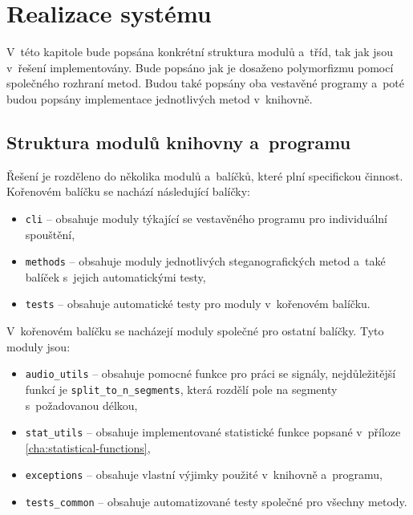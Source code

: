 
\chapter{Realizace systému}
\label{cha:implementation}

V~této kapitole bude popsána konkrétní struktura modulů a~tříd, tak jak jsou
v~řešení implementovány. Bude popsáno jak je dosaženo polymorfizmu pomocí
společného rozhraní metod. Budou také popsány oba vestavěné programy a~poté
budou popsány implementace jednotlivých metod v~knihovně.

\section{Struktura modulů knihovny a~programu}
\label{sec:modules}

Řešení je rozděleno do několika modulů a~balíčků, které plní specifickou
činnost. Kořenovém balíčku se nachází následující balíčky:

\begin{itemize}
    \item \texttt{cli} -- obsahuje moduly týkající se vestavěného programu pro
        individuální spouštění,
    \item \texttt{methods} -- obsahuje moduly jednotlivých steganografických
        metod a~také balíček s~jejich automatickými testy,
    \item \texttt{tests} -- obsahuje automatické testy pro moduly v~kořenovém
        balíčku.
\end{itemize}

V~kořenovém balíčku se nacházejí moduly společné pro ostatní balíčky. Tyto
moduly jsou:

\begin{itemize}
    \item \texttt{audio\_utils} -- obsahuje pomocné funkce pro práci se signály,
        nejdůležitější funkcí je \texttt{split\_to\_n\_segments}, která rozdělí
        pole na segmenty s~požadovanou délkou,
    \item \texttt{stat\_utils} -- obsahuje implementované statistické funkce
        popsané v~příloze \ref{cha:statistical-functions},
    \item \texttt{exceptions} -- obsahuje vlastní výjimky použité v~knihovně
        a~programu,
    \item \texttt{tests\_common} -- obsahuje automatizované testy společné pro
        všechny metody.
\end{itemize}

